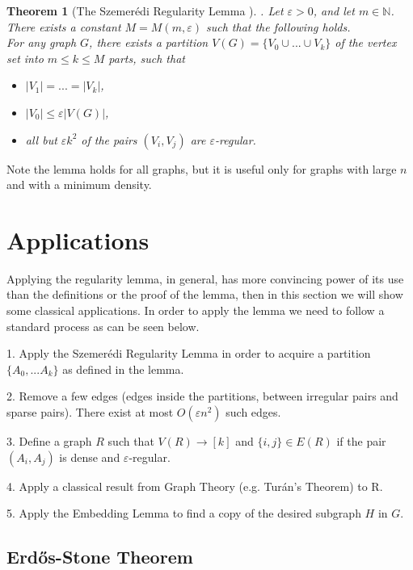 \documentclass[12pt,twoside,a4paper,bibliography=totocnumbered]{book}
\numberwithin{equation}{section}
\newtheorem{theorem}             {Theorem}[section]
\theoremstyle{remark}
\begin{document}
\begin{theorem}[{The Szemerédi Regularity Lemma \cite{Sz75}}]. Let $\varepsilon > 0$, and let $m \in  \mathbb{N}$. There exists a constant $M=M(m,\varepsilon)$ such that the following holds.\\
For any graph $G$, there exists a partition $V(G) = \{V_0 \cup ... \cup V_k\}$ of the vertex set into $m \leq k \leq M$ parts, such that
\begin{itemize}

	\item $|V_1| = ... =|V_k|$,
	
	\item $|V_0| \leq \varepsilon|V(G)|$,
	\item all but $\varepsilon k^2$ of the pairs $(V_i, V_j)$ are $\varepsilon$-regular. 
\end{itemize}
\end{theorem}

Note the lemma holds for all graphs, but it is useful only for graphs with large $n$ and with a minimum density.%

\section{Applications}
Applying the regularity lemma, in general, has more convincing power of its use than the definitions or the proof of the lemma, then in this section we will show some classical applications. In order to apply the lemma we need to follow a standard process as can be seen below.

1. Apply the Szemerédi Regularity Lemma in order to acquire a partition $ \{ A_0, ... A_k \} $ as defined in the lemma.

2. Remove a few edges (edges inside the partitions, between irregular pairs and sparse pairs). There exist at most $O(\varepsilon n^2)$ such edges.

3. Define a graph $R$ such that $V(R) \rightarrow [k]$ and $\{i,j\} \in E(R) $ if  the pair $(A_i, A_j)$ is dense and $\varepsilon$-regular.

4. Apply a classical result from Graph Theory (e.g. Turán's Theorem) to R.

5. Apply the Embedding Lemma to find a copy of the desired subgraph $H$ in $G$.
\subsection{Erd\H{o}s-Stone Theorem}
\end{document}
